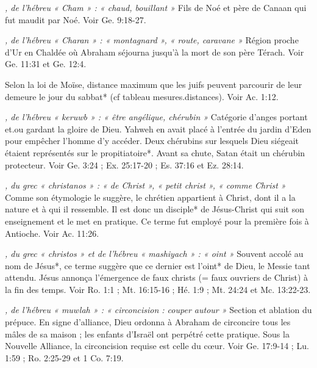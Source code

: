 \begin{multicols}{2}
{\textit{, de l'hébreu « Cham » : « chaud, bouillant »}\newline
Fils de Noé et père de Canaan qui fut maudit par Noé. Voir Ge. 9:18-27.

\textit{, de l'hébreu « Charan » : « montagnard », « route, caravane »}\newline
Région proche d'Ur en Chaldée où Abraham séjourna jusqu'à la mort de son père Térach. Voir Ge. 11:31 et Ge. 12:4.

\textit{}\newline
Selon la loi de Moïse, distance maximum que les juifs peuvent parcourir de leur demeure le jour du sabbat* (cf tableau mesures.distances). Voir Ac. 1:12.

\textit{, de l'hébreu « keruwb » : « être angélique, chérubin »}\newline
Catégorie d'anges portant et.ou gardant la gloire de Dieu. Yahweh en avait placé à l'entrée du jardin d'Eden pour empêcher l'homme d'y accéder. Deux chérubins sur lesquels Dieu siégeait étaient représentés sur le propitiatoire*. Avant sa chute, Satan était un chérubin protecteur. Voir Ge. 3:24 ; Ex. 25:17-20 ; Es. 37:16 et Ez. 28:14.

\textit{, du grec « christanos » : « de Christ », « petit christ », « comme Christ »}\newline
Comme son étymologie le suggère, le chrétien appartient à Christ, dont il a la nature et à qui il ressemble. Il est donc un disciple* de Jésus-Christ qui suit son enseignement et le met en pratique. Ce terme fut employé pour la première fois à Antioche. Voir Ac. 11:26.

\textit{, du grec « christos » et de l'hébreu « mashiyach » : « oint »}\newline
Souvent accolé au nom de Jésus*, ce terme suggère que ce dernier est l'oint* de Dieu, le Messie tant attendu. Jésus annonça l'émergence de faux christs (= faux ouvriers de Christ) à la fin des temps. Voir Ro. 1:1 ; Mt. 16:15-16 ; Hé. 1:9 ; Mt. 24:24 et Mc. 13:22-23.

\textit{, de l'hébreu « muwlah » : « circoncision : couper autour »}\newline
Section et ablation du prépuce. En signe d'alliance, Dieu ordonna à Abraham de circoncire tous les mâles de sa maison ; les enfants d'Israël ont perpétré cette pratique. Sous la Nouvelle Alliance, la circoncision requise est celle du cœur. Voir Ge. 17:9-14 ; Lu. 1:59 ; Ro. 2:25-29 et 1 Co. 7:19.

}
\end{multicols}
